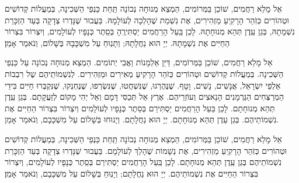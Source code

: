 {
אֵל מָלֵא רַחֲמִים, שׁוֹכֵן בַּמְּרוֹמִים, הַמְצֵא מְנוּחָה נְכוֹנָה תַּֽחַת כַּנְפֵי הַשְּׁכִינָה, בְּמַעֲלוֹת קְדוֹשִׁים וּטְהוֹרִים כְּזֹֽהַר הָרָקִֽיעַ מַזְהִירִים, אֶת נִשְׁמַת  שֶׁהָלְכָה לְעוֹלָמָהּ. בַּעֲבוּר שֶׁנָּדְרוּ צְדָקָה בְּעַד הַזְכָּרַת נִשְׁמָתָהּ, בְּגַן עֵֽדֶן תְּהֵא מְנוּחָתָהּ. לָכֵן בַּֽעַל הָרַחֲמִים יַסְתִּירֶֽהָ בְּסֵֽתֶר כְּנָפָיו לְעוֹלָמִים, וְיִצְרוֹר בִּצְרוֹר הַחַיִּים אֶת נִשְׁמָתָהּ. יְיָ הוּא נַחֲלָתָהּ; וְתָנֽוּחַ עַל מִשְׁכָּבָהּ בְּשָׁלוֹם, וְנֹאמַר אָמֵן׃

אֵל מָלֵא רַחֲמִים, שׁוֹכֵן בַּמְּרוֹמִים, דַּיַּן אַלְמָנוֹת וַאֲבִי יְתוֹמִים. הַמְצֵא מְנוּחָה נְכוֹנָה עַל כַּנְפֵי הַשְּׁכִינָה. בְּמַעֲלוֹת קְדוֹשִׁים וּטְהוֹרִים כְּזֹהַר הָרָקִיעַ מְאִירִים וּמַזְהִירִים. לְנִשְׁמוֹתֵיהֶם שֶל רִבְבוֹת אַלְפֵי יִשְׂרָאֵל, אֲנָשִׁים, נָשִׁים, וָטָף. שֶׁנֶּהֶרְגוּ, שֶׁנִּשְׁחֲטוּ, שֶׁנִּשְׂרְפוּ, שֶׁנֶּחְנְקוּ, שֶׁנִּקְבְּרוּ חַיִּים  בִּידֵי הַמְרַצְּחִים הַגֶּרְמָנִים הָנַאצִים וְעוֹזְרֵיהֶם. אֶרֶץ אַל תְּכַסִּי דָּמָם וְאַל יְהִי מָקוֹם לְזַעֲקָתָם. בְּגַן עֵֽדֶן תְּהֵא מְנוּחָתָם. לָכֵן בַּעַל הָרַחֲמִים יַסְתִּירֵם בְּסֵתֶר כְּנָפָיו לְעוֹלָמִים וְיִצְרוֹר בִּצְרוֹר הַחַיִּים אֶת נִשְׁמוֹתֵיהֶם. בְּגַן עֵדֶן תְּהֵא מְנוּחָתָם. יְיָ הוּא נַחֲלָתָם. וְיָנוּחוּ בְּשָׁלוֹם עַל מִשְׁכָּבָם, וְנֹאמַר אָמֵן.


אֵל מָלֵא רַחֲמִים, שׁוֹכֵן בַּמְּרוֹמִים, הַמְצֵא מְנוּחָה נְכוֹנָה תַּֽחַת כַּנְפֵי הַשְּׁכִינָה, בְּמַעֲלוֹת קְדוֹשִׁים וּטְהוֹרִים כְּזֹֽהַר הָרָקִֽיעַ מַזְהִירִים, אֶת נְשָׁמוֹת  שֶׁהָלַךְ לְעוֹלָמָם. בַּעֲבוּר שֶׁנָּדְרוּ צְדָקָה בְּעַד הַזְכָּרַת נִשְׁמוֹתֵיהֶם בְּגַן עֵֽדֶן תְּהֵא מְנוּחָתָם. לָכֵן בַּֽעַל הָרַחֲמִים יַסְתִּירֵם בְּסֵֽתֶר כְּנָפָיו לְעוֹלָמִים, וְיִצְרוֹר בִּצְרוֹר הַחַיִּים אֶת נִשְׁמוֹתֵיהֶם. יְיָ הוּא נַחֲלָתָם; וְיָנֽוּחַ בְּשָׁלוֹם עַל מִשְׁכָּבָם, וְנֹאמַר אָמֵן׃

}
{}


\yekumpurkans

